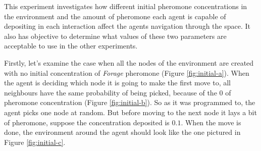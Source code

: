 This experiment investigates how different initial pheromone concentrations in the environment and the amount of pheromone each agent is capable of depositing in each interaction affect the agents navigation through the space. It also has objective to determine what values of these two parameters are acceptable to use in the other experiments.

Firstly, let's examine the case when all the nodes of the environment are created with no initial concentration of \emph{Forage} pheromone (Figure \ref{fig:initial-a}). When the agent is deciding which node it is going to make the first move to, all neighbours have the same probability of being picked, because of the $0$ of pheromone concentration (Figure \ref{fig:initial-b}). So as it was programmed to, the agent picks one node at random. But before moving to the next node it lays a bit of pheromone, suppose the concentration deposited is $0.1$. When the move is done, the environment around the agent should look like the one pictured in Figure \ref{fig:initial-c}.

